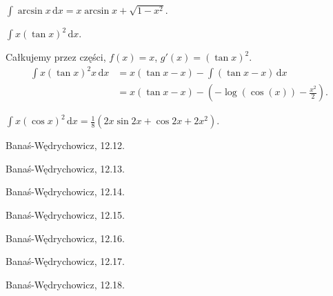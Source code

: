 \begin{integralsolved}
    $\int \arcsin x \,\mathrm{d} x = x \arcsin x + \sqrt{1-x^2}$.
\end{integralsolved}

\begin{integral}
    $\int x (\tan x)^2 \,\mathrm{d} x$.
\end{integral}

\begin{solution}
    Całkujemy przez części, $f(x) = x$, $g'(x) = (\tan x)^2$.
    \begin{align}
        \int x (\tan x)^2 x \, \mathrm{d} x & = x (\tan x - x) - \int (\tan x - x) \,\mathrm{d}x \\
        & = x (\tan x - x) - \left(-\log(\cos(x)) - \frac{x^2}{2}\right).
    \end{align}
\end{solution}

\begin{integralsolved}
    $\int x (\cos x)^2 \,\mathrm{d} x = \frac{1}{8} (2x \sin 2x + \cos 2x + 2x^2)$.
\end{integralsolved}


\begin{integral}
    Banaś-Wędrychowicz, 12.12.
\end{integral}

\begin{integral}
Banaś-Wędrychowicz, 12.13.
\end{integral}

\begin{integral}
Banaś-Wędrychowicz, 12.14.
\end{integral}

\begin{integral}
Banaś-Wędrychowicz, 12.15.
\end{integral}

\begin{integral}
Banaś-Wędrychowicz, 12.16.
\end{integral}

\begin{integral}
Banaś-Wędrychowicz, 12.17.
\end{integral}

\begin{integral}
Banaś-Wędrychowicz, 12.18.
\end{integral}

